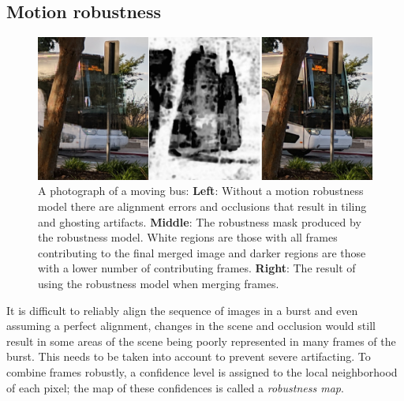 \documentclass{sig-alternate}
\begin{document}


\subsection{Motion robustness}
\label{sec:robustnessModel}

\begin{figure}
\centering
\includegraphics[width=\columnwidth]{figures/wronski2019-figure-9-95quality.jpg}
\caption{A photograph of a moving bus: \textbf{Left}: Without a motion robustness model there are alignment errors and occlusions that result in tiling and ghosting artifacts. \textbf{Middle}: The robustness mask produced by the robustness model. White regions are those with all frames contributing to the final merged image and darker regions are those with a lower number of contributing frames. \textbf{Right}: The result of using the robustness model when merging frames. \cite{Wronski2019}}
\label{fig:Wronski2019Fig9}
\end{figure}

 
It is difficult to reliably align the sequence of images in a burst and even assuming a perfect alignment, changes in the scene and occlusion would still result in some areas of the scene being poorly represented in many frames of the burst. This needs to be taken into account to prevent severe artifacting. To combine frames robustly, a confidence level is assigned to the local neighborhood of each pixel; the map of these confidences is called a \emph{robustness map}.
\end{document}
